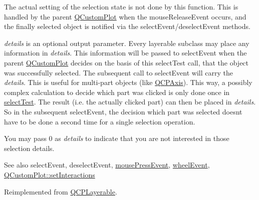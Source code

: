 The actual setting of the selection state is not done by this function. This is handled by the parent \hyperlink{class_q_custom_plot}{Q\+Custom\+Plot} when the mouse\+Release\+Event occurs, and the finally selected object is notified via the select\+Event/deselect\+Event methods.

{\itshape details} is an optional output parameter. Every layerable subclass may place any information in {\itshape details}. This information will be passed to select\+Event when the parent \hyperlink{class_q_custom_plot}{Q\+Custom\+Plot} decides on the basis of this select\+Test call, that the object was successfully selected. The subsequent call to select\+Event will carry the {\itshape details}. This is useful for multi-\/part objects (like \hyperlink{class_q_c_p_axis}{Q\+C\+P\+Axis}). This way, a possibly complex calculation to decide which part was clicked is only done once in \hyperlink{class_q_c_p_abstract_plottable_a38efe9641d972992a3d44204bc80ec1d}{select\+Test}. The result (i.\+e. the actually clicked part) can then be placed in {\itshape details}. So in the subsequent select\+Event, the decision which part was selected doesn\textquotesingle{}t have to be done a second time for a single selection operation.

You may pass 0 as {\itshape details} to indicate that you are not interested in those selection details.

\begin{DoxySeeAlso}{See also}
select\+Event, deselect\+Event, \hyperlink{class_q_c_p_layerable_af6567604818db90f4fd52822f8bc8376}{mouse\+Press\+Event}, \hyperlink{class_q_c_p_layerable_a47dfd7b8fd99c08ca54e09c362b6f022}{wheel\+Event}, \hyperlink{class_q_custom_plot_a5ee1e2f6ae27419deca53e75907c27e5}{Q\+Custom\+Plot\+::set\+Interactions} 
\end{DoxySeeAlso}


Reimplemented from \hyperlink{class_q_c_p_layerable_a04db8351fefd44cfdb77958e75c6288e}{Q\+C\+P\+Layerable}.



